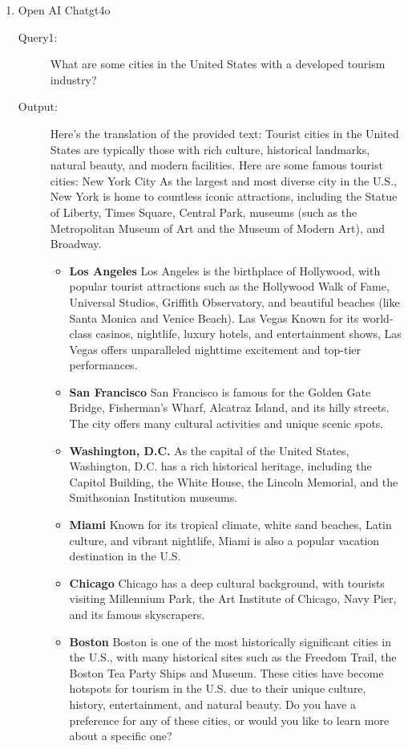 \documentclass{mcmthesis}
\begin{document}
\begin{enumerate}
\item Open AI Chatgt4o 
\begin{description}
\item[Query1:] What are some cities in the United States with a developed tourism industry? 
\item[Output:] Here’s the translation of the provided text:
Tourist cities in the United States are typically those with rich culture, historical landmarks, natural beauty, and modern facilities. Here are some famous tourist cities:
New York City
As the largest and most diverse city in the U.S., New York is home to countless iconic attractions, including the Statue of Liberty, Times Square, Central Park, museums (such as the Metropolitan Museum of Art and the Museum of Modern Art), and Broadway.
\begin{itemize}
  \item \textbf{Los Angeles}
  Los Angeles is the birthplace of Hollywood, with popular tourist attractions such as the Hollywood Walk of Fame, Universal Studios, Griffith Observatory, and beautiful beaches (like Santa Monica and Venice Beach).
  Las Vegas
  Known for its world-class casinos, nightlife, luxury hotels, and entertainment shows, Las Vegas offers unparalleled nighttime excitement and top-tier performances.
  \item \textbf{San Francisco}
  San Francisco is famous for the Golden Gate Bridge, Fisherman’s Wharf, Alcatraz Island, and its hilly streets. The city offers many cultural activities and unique scenic spots.
  \item \textbf{Washington, D.C.}
  As the capital of the United States, Washington, D.C. has a rich historical heritage, including the Capitol Building, the White House, the Lincoln Memorial, and the Smithsonian Institution museums.
  \item \textbf{Miami}
  Known for its tropical climate, white sand beaches, Latin culture, and vibrant nightlife, Miami is also a popular vacation destination in the U.S.
  \item \textbf{Chicago}
  Chicago has a deep cultural background, with tourists visiting Millennium Park, the Art Institute of Chicago, Navy Pier, and its famous skyscrapers.
  \item \textbf{Boston}
  Boston is one of the most historically significant cities in the U.S., with many historical sites such as the Freedom Trail, the Boston Tea Party Ships and Museum.
  These cities have become hotspots for tourism in the U.S. due to their unique culture, history, entertainment, and natural beauty. Do you have a preference for any of these cities, or would you like to learn more about a specific one?
\end{itemize}


\end{description}
\end{enumerate}
\end{document}
